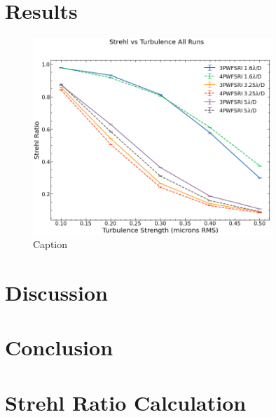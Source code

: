 \documentclass[12pt]{spieman}  %
\begin{document}
\begin{spacing}{2}

 





\section{Results}

\begin{figure}
    \centering
    \includegraphics[width=0.8\textwidth]{StrehlvsTurbRI4vs3.png}
    \caption{Caption}
    \label{fig:my_label}
\end{figure}
\section{Discussion}
\section{Conclusion}

\appendix
\section{Strehl Ratio Calculation}


\end{spacing}
\end{document}
